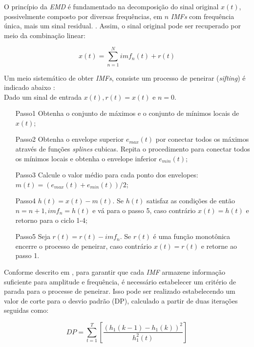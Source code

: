 \documentclass[10pt,journal,compsoc]{IEEEtran}
\begin{document}
O princípio da \textit{EMD} é fundamentado na decomposição do sinal original $ x(t) $, possivelmente composto por diversas frequências, em $ n $ \textit{IMFs} com frequência única, mais um sinal residual. \cite{Lu2018S337}. Assim, o sinal original pode ser recuperado por meio da combinação linear:

\begin{equation}\label{eq_emd}
x(t) = \sum_{n=1}^N imf_n(t) + r(t)
\end{equation} 

Um meio sistemático de obter \textit{IMFs}, consiste um processo de peneirar (\textit{sifting}) é indicado abaixo \cite{Li2013807}: \\
Dado um sinal de entrada $ x(t), r(t) = x(t) $ e $ n = 0 $.

\begin{itemize}[]
	\item[Passo1] Obtenha o conjunto de máximos e o conjunto de mínimos locais de $ x(t) $;
	\item[Passo2] Obtenha o envelope superior $ e_{max}(t) $ por conectar todos os máximos através de funções \textit{splines} cubicas. Repita o procedimento para conectar todos os mínimos locais e obtenha o envelope inferior $ e_{min}(t) $;
	\item[Passo3] Calcule o valor médio para cada ponto dos envelopes: $ m(t) = (e_{max}(t) + e_{min}(t)) / 2 $;
	\item[Passo4] $ h(t) = x(t) - m(t) $. Se $ h(t) $ satisfaz as condições de então $ n = n + 1, imf_n = h(t) $ e vá para o passo 5, caso contrário $ x(t) = h(t) $ e retorno para o ciclo 1-4;
	\item[Passo5] Seja $ r(t) = r(t) - imf_n $. Se $ r(t) $ é uma função monotônica encerre o processo de peneirar, caso contrário $ x(t) = r(t) $ e retorne ao passo 1.  \\
	
\end{itemize} 

Conforme descrito em \cite{Huang1998}, para garantir que cada \textit{IMF} armazene informação suficiente para amplitude e frequência, é necessário estabelecer um critério de parada para o processe de peneirar. Isso pode ser realizado estabelecendo um valor de corte para o desvio padrão (DP), calculado a partir de duas iterações seguidas como:

\begin{equation}\label{eq_dp}
DP = \sum_{t=1}^T[\frac{(h_1(k-1) - h_1(k))^2}{h_1^2(t)}]
\end{equation} 
\end{document}
